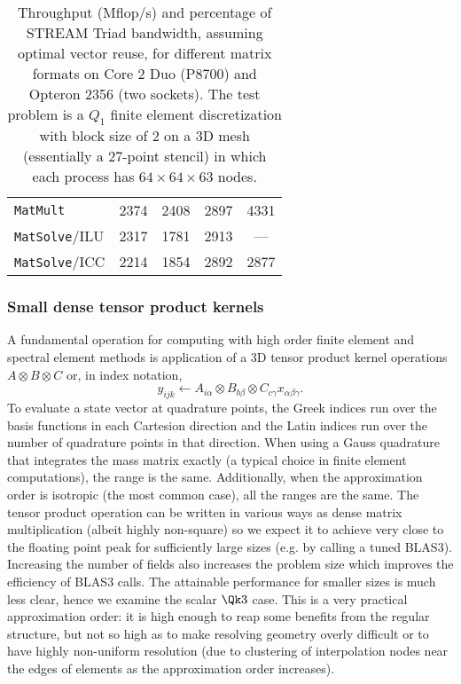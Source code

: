 \begin{table}
\begin{tabular}{l|c|c|c|c}
    \texttt{MatMult}      &  2374  & 2408      &  2897      & 4331      \\
    \texttt{MatSolve}/ILU &  2317  & 1781      &  2913      & ---       \\
    \texttt{MatSolve}/ICC &  2214  & 1854      &  2892      & 2877      \\
  \end{tabular}
  \caption{Throughput (Mflop/s) and percentage of STREAM Triad bandwidth, assuming optimal vector reuse, for different matrix formats on Core 2 Duo (P8700) and Opteron 2356 (two sockets). The test problem is a $Q_1$ finite element discretization with block size of 2 on a 3D mesh (essentially a 27-point stencil) in which each process has $64\times 64\times 63$ nodes.}\label{tab:throughput:baij}
\end{table}

\subsubsection{Small dense tensor product kernels}
A fundamental operation for computing with high order finite element and spectral element methods is application of a 3D tensor product kernel operations $A\otimes B\otimes C$ or, in index notation,
\begin{equation}\label{eq:tensor:kernel}
  y_{ijk} \gets A_{i\alpha} \otimes B_{b\beta} \otimes C_{c\gamma} x_{\alpha\beta\gamma} .
\end{equation}
To evaluate a state vector at quadrature points, the Greek indices run over the basis functions in each Cartesion direction and the Latin indices run over the number of quadrature points in that direction.
When using a Gauss quadrature that integrates the mass matrix exactly (a typical choice in finite element computations), the range is the same.
Additionally, when the approximation order is isotropic (the most common case), all the ranges are the same.
The tensor product operation can be written in various ways as dense matrix multiplication (albeit highly non-square) so we expect it to achieve very close to the floating point peak for sufficiently large sizes (e.g. by calling a tuned BLAS3).
Increasing the number of fields also increases the problem size which improves the efficiency of BLAS3 calls.
The attainable performance for smaller sizes is much less clear, hence we examine the scalar $\Qk 3$ case.
This is a very practical approximation order: it is high enough to reap some benefits from the regular structure, but not so high as to make resolving geometry overly difficult or to have highly non-uniform resolution (due to clustering of interpolation nodes near the edges of elements as the approximation order increases).

